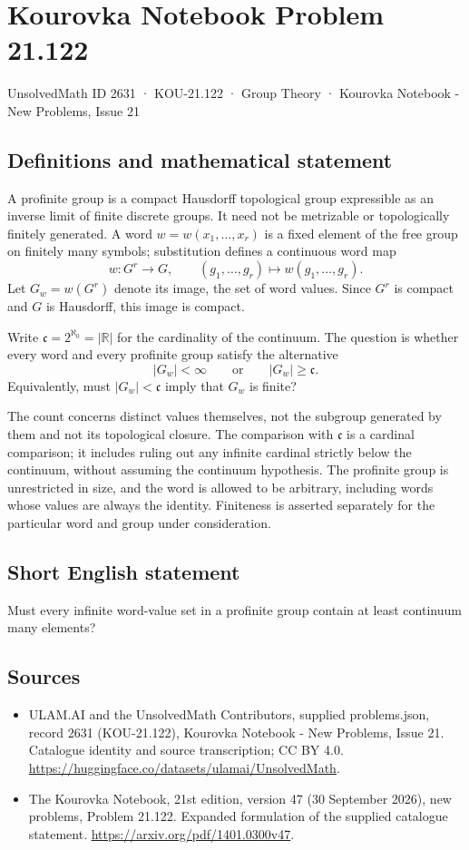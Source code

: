 \documentclass[11pt,a4paper]{article}
\begin{document}
\section*{Kourovka Notebook Problem 21.122}\label{2631}
{\small UnsolvedMath ID 2631 · KOU-21.122 · Group Theory · Kourovka Notebook - New Problems, Issue 21}
\subsection{Definitions and mathematical statement}
A profinite group is a compact Hausdorff topological group expressible as an inverse limit of finite discrete groups. It need not be metrizable or topologically finitely generated. A word $w=w(x_1,\ldots,x_r)$ is a fixed element of the free group on finitely many symbols; substitution defines a continuous word map
\[
 w:G^r\longrightarrow G,
 \qquad (g_1,\ldots,g_r)\longmapsto w(g_1,\ldots,g_r).
\]
Let $G_w=w(G^r)$ denote its image, the set of word values. Since $G^r$ is compact and $G$ is Hausdorff, this image is compact.

Write $\mathfrak c=2^{\aleph_0}=|\mathbb R|$ for the cardinality of the continuum. The question is whether every word and every profinite group satisfy the alternative
\[
 |G_w|<\infty\qquad\text{or}\qquad |G_w|\ge\mathfrak c.
\]
Equivalently, must $|G_w|<\mathfrak c$ imply that $G_w$ is finite?

The count concerns distinct values themselves, not the subgroup generated by them and not its topological closure. The comparison with $\mathfrak c$ is a cardinal comparison; it includes ruling out any infinite cardinal strictly below the continuum, without assuming the continuum hypothesis. The profinite group is unrestricted in size, and the word is allowed to be arbitrary, including words whose values are always the identity. Finiteness is asserted separately for the particular word and group under consideration.
\subsection{Short English statement}
Must every infinite word-value set in a profinite group contain at least continuum many elements?
\subsection{Sources}
\begin{itemize}
\item[S1] ULAM.AI and the UnsolvedMath Contributors, supplied problems.json, record 2631 (KOU-21.122), Kourovka Notebook - New Problems, Issue 21. Catalogue identity and source transcription; CC BY 4.0.
\url{https://huggingface.co/datasets/ulamai/UnsolvedMath}.
\item[S2] The Kourovka Notebook, 21st edition, version 47 (30 September 2026), new problems, Problem 21.122. Expanded formulation of the supplied catalogue statement.
\url{https://arxiv.org/pdf/1401.0300v47}.
\end{itemize}
\end{document}
